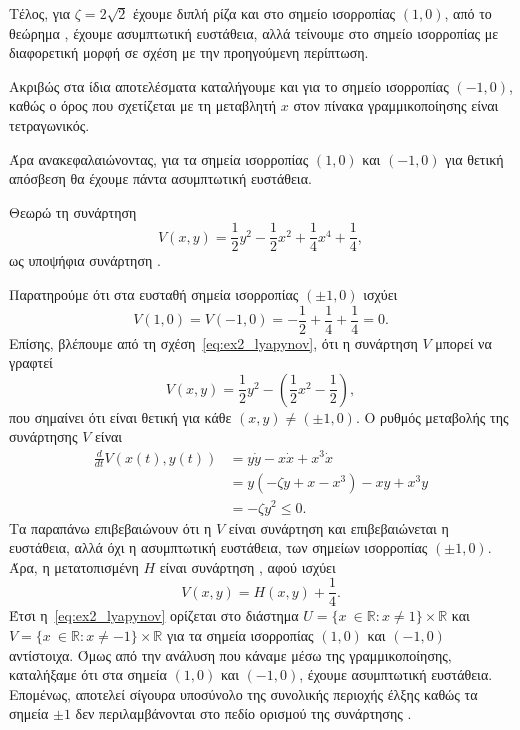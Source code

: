 \begin{solution}
    Τέλος, για \( \zeta = 2\sqrt{2} \) έχουμε διπλή ρίζα και στο σημείο
    ισορροπίας \( (1, 0) \), από το θεώρημα , έχουμε
    ασυμπτωτική ευστάθεια, αλλά τείνουμε στο σημείο ισορροπίας με διαφορετική
    μορφή σε σχέση με την προηγούμενη περίπτωση.

    Ακριβώς στα ίδια αποτελέσματα καταλήγουμε και για το σημείο ισορροπίας
    \( (-1, 0) \), καθώς ο όρος που σχετίζεται με τη μεταβλητή \(x\) στον πίνακα
    γραμμικοποίησης είναι τετραγωνικός.

    Άρα ανακεφαλαιώνοντας, για τα σημεία ισορροπίας \( (1, 0) \) και \( (-1, 0)
    \) για θετική απόσβεση θα έχουμε πάντα ασυμπτωτική ευστάθεια.

    Θεωρώ τη συνάρτηση
    \begin{equation}\label{eq:ex2_lyapynov}
        V(x, y) = \frac{1}{2}y^2 - \frac{1}{2}x^2 + \frac{1}{4}x^4 +
        \frac{1}{4},
    \end{equation}
    ως υποψήφια συνάρτηση .

    Παρατηρούμε ότι στα ευσταθή σημεία ισορροπίας \( (\pm1, 0) \) ισχύει
    \begin{equation*}
        V(1, 0) =  V(-1, 0) = -\frac{1}{2} + \frac{1}{4} + \frac{1}{4} = 0.
    \end{equation*}
    Επίσης, βλέπουμε από τη σχέση~\eqref{eq:ex2_lyapynov}, ότι η συνάρτηση \( V \)
    μπορεί να γραφτεί
    \begin{equation*}
        V(x, y) = \frac{1}{2}y^2 - \left( \frac{1}{2}x^2 - \frac{1}{2} \right),
    \end{equation*}
    που σημαίνει ότι είναι θετική για κάθε \( (x, y) \neq (\pm1, 0) \). Ο ρυθμός
    μεταβολής της συνάρτησης \( V \) είναι
    \begin{align*}
        \frac{d}{dt}V\left( x(t), y(t) \right) &= y\dot{y} - x\dot{x} +
        x^3\dot{x} \\
        &= y\left( -\zeta y + x - x^3 \right) - xy + x^3 y \\
        &= -\zeta y^2 \leq 0.
    \end{align*}
    Τα παραπάνω επιβεβαιώνουν ότι η \( V \) είναι συνάρτηση  και
    επιβεβαιώνεται η ευστάθεια, αλλά όχι η ασυμπτωτική ευστάθεια, των σημείων
    ισορροπίας \( (\pm1, 0) \). Άρα, η μετατοπισμένη \( H \) είναι συνάρτηση
    , αφού ισχύει
    \begin{equation*}
        V(x, y) = H(x, y) + \frac{1}{4}.
    \end{equation*}
    Έτσι η~\eqref{eq:ex2_lyapynov} ορίζεται στο διάστημα \( U = \{ x\ \in
    \mathbb{R}: x \neq 1 \}\times\mathbb{R} \) και \( V = \{ x\ \in
    \mathbb{R}: x \neq -1 \}\times\mathbb{R} \) για τα σημεία ισορροπίας \(
    (1, 0) \) και \( (-1, 0) \) αντίστοιχα. Όμως από την ανάλυση που
    κάναμε μέσω της γραμμικοποίησης, καταλήξαμε ότι στα σημεία \( (1, 0) \) και
    \( (-1, 0) \), έχουμε ασυμπτωτική ευστάθεια. Επομένως, αποτελεί σίγουρα
    υποσύνολο της συνολικής περιοχής έλξης καθώς τα σημεία \( \pm1 \)
    δεν περιλαμβάνονται στο πεδίο ορισμού της συνάρτησης .


\end{solution}
